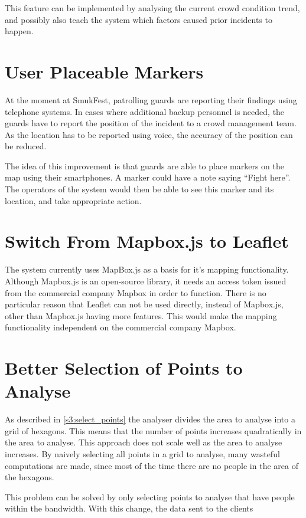 This feature can be implemented by analysing the current crowd condition trend, and possibly also teach the system which factors caused prior incidents to happen.

\section{User Placeable Markers}
At the moment at SmukFest, patrolling guards are reporting their findings using telephone systems. In cases where additional backup personnel is needed, the guards have to report the position of the incident to a crowd management team. As the location has to be reported using voice, the accuracy of the position can be reduced.

The idea of this improvement is that guards are able to place markers on the map using their smartphones. A marker could have a note saying \enquote{Fight here}. The operators of the system would then be able to see this marker and its location, and take appropriate action.

\section{Switch From Mapbox.js to Leaflet}
The system currently uses MapBox.js as a basis for it's mapping functionality. Although Mapbox.js is an open-source library, it needs an access token issued from the commercial company Mapbox in order to function. There is no particular reason that Leaflet can not be used directly, instead of Mapbox.js, other than Mapbox.js having more features. This would make the mapping functionality independent on the commercial company Mapbox.

\section{Better Selection of Points to Analyse}
As described in \cref{s3:select_points} the analyser divides the area to analyse into a grid of hexagons. This means that the number of points increases quadratically in the area to analyse. This approach does not scale well as the area to analyse increases. By naively selecting all points in a grid to analyse, many wasteful computations are made, since most of the time there are no people in the area of the hexagons.

This problem can be solved by only selecting points to analyse that have people within the bandwidth. With this change, the data sent to the clients 